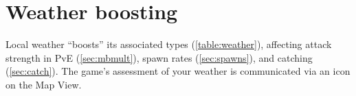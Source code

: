 \section{Weather boosting\label{sec:weather}}
Local weather ``boosts'' its associated types (\autoref{table:weather}), affecting attack strength
 in PvE (\autoref{sec:mbmult}),
 spawn rates (\autoref{sec:spawns}), and catching (\autoref{sec:catch}).
The game's assessment of your weather is communicated via an icon on the Map View.
\begin{table}

\end{table}
